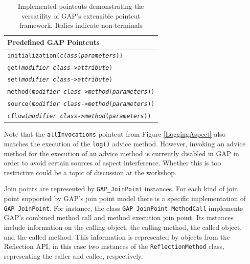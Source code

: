 \documentclass{acm_proc_article-sp}
\begin{document}
\begin{table}[b!]
\begin{tabular}{l}
  \hline
  \textbf{Predefined GAP Pointcuts}\\
  \hline
  \small{\texttt{initialization(\emph{class}(\emph{parameters}))}}\\
  \small{\texttt{get(\emph{modifier} \emph{class}->\emph{attribute})}} \\
  \small{\texttt{set(\emph{modifier} \emph{class}->\emph{attribute})}}\\
  \small{\texttt{method(\emph{modifier} \emph{class}->\emph{method}(\emph{parameters}))}}\\
  \small{\texttt{source(\emph{modifier} \emph{class}->\emph{method}(\emph{parameters}))}}\\
  \small{\texttt{cflow(\emph{modifier} \emph{class}->\emph{method}(\emph{parameters}))}}\\
  \hline
\end{tabular}
\caption{Implemented pointcuts demonstrating the versatility of
GAP's extensible pointcut framework. Italics indicate
non-terminals} \label{tab:pointcuts}
\end{table}

Note that the \texttt{allInvocations} pointcut from Figure
\ref{LoggingAspect} also matches the execution of the
\texttt{log()} advice method. However, invoking an advice method
for the execution of an advice method is currently disabled in GAP
in order to avoid certain sources of aspect interference. Whether
this is too restrictive could be a topic of discussion at the
workshop.

Join points are represented by \texttt{GAP\_JoinPoint} instances.
For each kind of join point supported by GAP's join point model
there is a specific implementation of \texttt{GAP\_JoinPoint}. For
instance, the class \texttt{GAP\_JoinPoint\_MethodCall} implements
GAP's combined method call and method execution join point. Its
instances include information on the calling object, the calling
method, the called object, and the called method. This information
is represented by objects from the Reflection API, in this case
two instances of the \texttt{ReflectionMethod} class, representing
the caller and callee, respectively.
\end{document}
